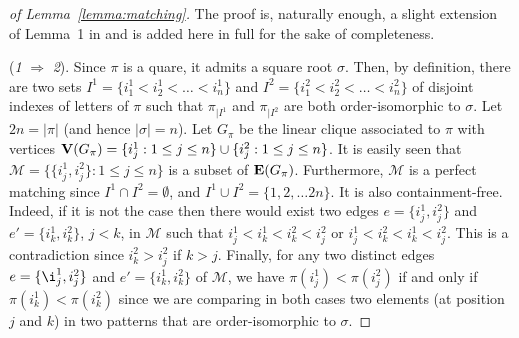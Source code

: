\documentclass[a4paper]{llncs}
\begin{document}
\begin{proof}[of Lemma~\ref{lemma:matching}]
  The proof is, naturally enough, a slight extension of
  Lemma~1 in \cite{Rizzi:Vialette:CSR:2013} and
  is added here in full for the sake of completeness.

  (\emph{1} $\Rightarrow$ \emph{2}).
  Since $\pi$ is a quare, it admits a square root $\sigma$. Then, by
  definition, there
  are two sets $I^1 = \{i^1_1 < i^1_2 < \dots < i^1_n\}$ and
  $I^2 = \{i^2_1 < i^2_2 < \dots < i^2_n\}$ of disjoint indexes of
  letters of $\pi$ such that $\pi_{|I^1}$ and $\pi_{|I^2}$ are both
  order-isomorphic to $\sigma$.
  Let $2n = |\pi|$ (and hence $|\sigma| = n$).
  Let $G_\pi$ be the linear clique associated to $\pi$ with
  vertices $\mathbf{V}(G_\pi) =
  \{i^1_j : 1 \leq j \leq n\} \cup \{i^2_j : 1 \leq j \leq n\}$.
  It is easily seen that
  $\mathcal{M} = \{\{i^1_j, i^2_j\} : 1 \leq j \leq n\}$
  is a subset of $\mathbf{E}(G_\pi)$.
  Furthermore, $\mathcal{M}$ is a perfect matching since
  $I^1 \cap I^2 = \emptyset$,
  and $I^1 \cup I^2 = \{1, 2,  \ldots 2n\}$.
  It is also containment-free.
  Indeed, if it is not the case then there would exist two edges
  $e = \{i^1_j, i^2_j\}$ and
  $e' = \{i^1_k, i^2_k\}$, $j < k$,
  in $\mathcal{M}$ such that
  $i^1_j < i^1_k < i^2_k < i^2_j$ or
  $i^1_j < i^2_k < i^1_k < i^2_j$.
  This is a contradiction since
  $i^2_k > i^2_j$ if $k > j$.
  Finally, for any two distinct edges
  $e = \{\i^1_j, i^2_j\}$ and
  $e' = \{i^1_k, i^2_k\}$ of $\mathcal{M}$,
  we have $\pi(i^1_j) < \pi(i^2_j)$ if and only if
  $\pi(i^1_k) < \pi(i^2_k)$ since we are comparing
  in both cases two elements (at position $j$ and $k$)
  in two patterns that are order-isomorphic to $\sigma$.


\end{proof}
\end{document}

